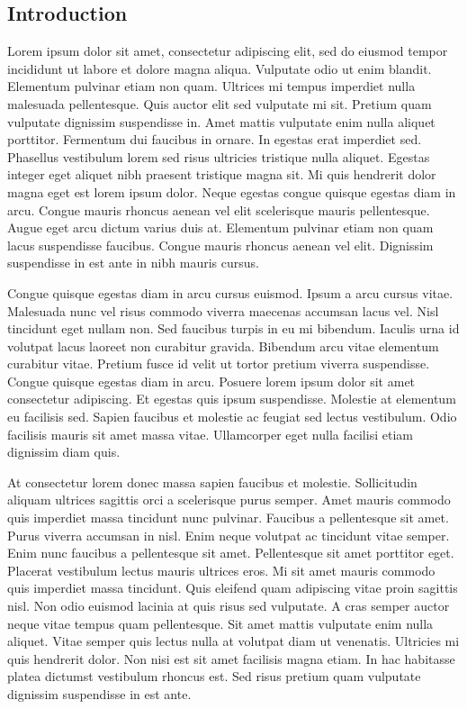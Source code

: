 \documentclass[12pt]{article}
\begin{document}
\pagebreak{}
\begin{spacing}{1.4}

\section{Introduction}

Lorem ipsum dolor sit amet, consectetur adipiscing elit, sed do eiusmod tempor incididunt ut labore et dolore magna aliqua. Vulputate odio ut enim blandit. Elementum pulvinar etiam non quam. Ultrices mi tempus imperdiet nulla malesuada pellentesque. Quis auctor elit sed vulputate mi sit. Pretium quam vulputate dignissim suspendisse in. Amet mattis vulputate enim nulla aliquet porttitor. Fermentum dui faucibus in ornare. In egestas erat imperdiet sed. Phasellus vestibulum lorem sed risus ultricies tristique nulla aliquet. Egestas integer eget aliquet nibh praesent tristique magna sit. Mi quis hendrerit dolor magna eget est lorem ipsum dolor. Neque egestas congue quisque egestas diam in arcu. Congue mauris rhoncus aenean vel elit scelerisque mauris pellentesque. Augue eget arcu dictum varius duis at. Elementum pulvinar etiam non quam lacus suspendisse faucibus. Congue mauris rhoncus aenean vel elit. Dignissim suspendisse in est ante in nibh mauris cursus.

Congue quisque egestas diam in arcu cursus euismod. Ipsum a arcu cursus vitae. Malesuada nunc vel risus commodo viverra maecenas accumsan lacus vel. Nisl tincidunt eget nullam non. Sed faucibus turpis in eu mi bibendum. Iaculis urna id volutpat lacus laoreet non curabitur gravida. Bibendum arcu vitae elementum curabitur vitae. Pretium fusce id velit ut tortor pretium viverra suspendisse. Congue quisque egestas diam in arcu. Posuere lorem ipsum dolor sit amet consectetur adipiscing. Et egestas quis ipsum suspendisse. Molestie at elementum eu facilisis sed. Sapien faucibus et molestie ac feugiat sed lectus vestibulum. Odio facilisis mauris sit amet massa vitae. Ullamcorper eget nulla facilisi etiam dignissim diam quis.

At consectetur lorem donec massa sapien faucibus et molestie. Sollicitudin aliquam ultrices sagittis orci a scelerisque purus semper. Amet mauris commodo quis imperdiet massa tincidunt nunc pulvinar. Faucibus a pellentesque sit amet. Purus viverra accumsan in nisl. Enim neque volutpat ac tincidunt vitae semper. Enim nunc faucibus a pellentesque sit amet. Pellentesque sit amet porttitor eget. Placerat vestibulum lectus mauris ultrices eros. Mi sit amet mauris commodo quis imperdiet massa tincidunt. Quis eleifend quam adipiscing vitae proin sagittis nisl. Non odio euismod lacinia at quis risus sed vulputate. A cras semper auctor neque vitae tempus quam pellentesque. Sit amet mattis vulputate enim nulla aliquet. Vitae semper quis lectus nulla at volutpat diam ut venenatis. Ultricies mi quis hendrerit dolor. Non nisi est sit amet facilisis magna etiam. In hac habitasse platea dictumst vestibulum rhoncus est. Sed risus pretium quam vulputate dignissim suspendisse in est ante.


\end{spacing}
\end{document}
